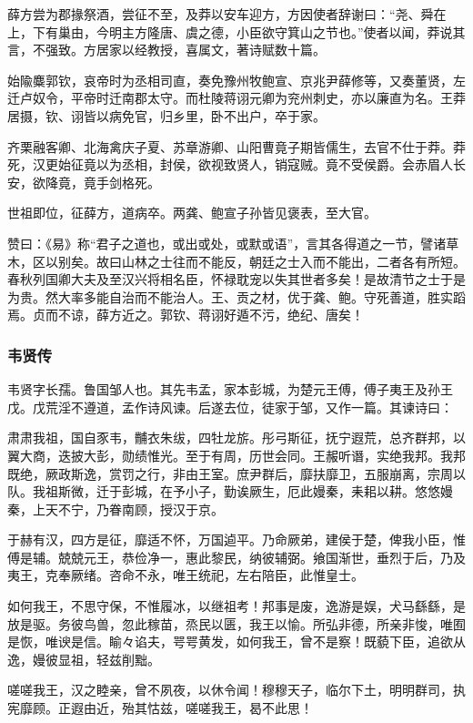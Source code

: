 \documentclass[]{article}
\begin{document}
薛方尝为郡掾祭酒，尝征不至，及莽以安车迎方，方因使者辞谢曰：``尧、舜在上，下有巢由，今明主方隆唐、虞之德，小臣欲守箕山之节也。''使者以闻，莽说其言，不强致。方居家以经教授，喜属文，著诗赋数十篇。

始隃麋郭钦，哀帝时为丞相司直，奏免豫州牧鲍宣、京兆尹薛修等，又奏董贤，左迁卢奴令，平帝时迁南郡太守。而杜陵蒋诩元卿为兖州刺史，亦以廉直为名。王莽居摄，钦、诩皆以病免官，归乡里，卧不出户，卒于家。

齐栗融客卿、北海禽庆子夏、苏章游卿、山阳曹竟子期皆儒生，去官不仕于莽。莽死，汉更始征竟以为丞相，封侯，欲视致贤人，销寇贼。竟不受侯爵。会赤眉人长安，欲降竟，竟手剑格死。

世祖即位，征薛方，道病卒。两龚、鲍宣子孙皆见褒表，至大官。

赞曰：《易》称``君子之道也，或出或处，或默或语''，言其各得道之一节，譬诸草木，区以别矣。故曰山林之士往而不能反，朝廷之士入而不能出，二者各有所短。春秋列国卿大夫及至汉兴将相名臣，怀禄耽宠以失其世者多矣！是故清节之士于是为贵。然大率多能自治而不能治人。王、贡之材，优于龚、鲍。守死善道，胜实蹈焉。贞而不谅，薛方近之。郭钦、蒋诩好遁不污，绝纪、唐矣！

\hypertarget{header-n5286}{%
\subsubsection{韦贤传}\label{header-n5286}}

韦贤字长孺。鲁国邹人也。其先韦孟，家本彭城，为楚元王傅，傅子夷王及孙王戊。戊荒淫不遵道，孟作诗风谏。后遂去位，徒家于邹，又作一篇。其谏诗曰：

肃肃我祖，国自豕韦，黼衣朱绂，四牡龙旂。彤弓斯征，抚宁遐荒，总齐群邦，以翼大商，迭披大彭，勋绩惟光。至于有周，历世会同。王赧听谮，实绝我邦。我邦既绝，厥政斯逸，赏罚之行，非由王室。庶尹群后，靡扶靡卫，五服崩离，宗周以队。我祖斯微，迁于彭城，在予小子，勤诶厥生，厄此嫚秦，耒耜以耕。悠悠嫚秦，上天不宁，乃眷南顾，授汉于京。

于赫有汉，四方是征，靡适不怀，万国逌平。乃命厥弟，建侯于楚，俾我小臣，惟傅是辅。兢兢元王，恭俭净一，惠此黎民，纳彼辅弼。飨国渐世，垂烈于后，乃及夷王，克奉厥绪。咨命不永，唯王统祀，左右陪臣，此惟皇士。

如何我王，不思守保，不惟履冰，以继祖考！邦事是废，逸游是娱，犬马繇繇，是放是驱。务彼鸟兽，忽此稼苗，烝民以匮，我王以愉。所弘非德，所亲非悛，唯囿是恢，唯谀是信。睮々谄夫，咢咢黄发，如何我王，曾不是察！既藐下臣，追欲从逸，嫚彼显祖，轻兹削黜。

嗟嗟我王，汉之睦亲，曾不夙夜，以休令闻！穆穆天子，临尔下土，明明群司，执宪靡顾。正遐由近，殆其怙兹，嗟嗟我王，曷不此思！
\end{document}
